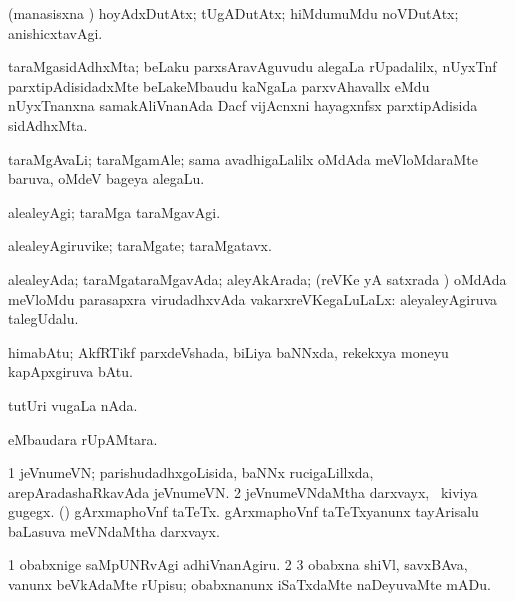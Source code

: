 {\bentry
{} 
\gl{\kirxvi}
\expl{}
\bmng
(manasisxna \vi) hoyAdxDutAtx; tUgADutAtx; hiMdumuMdu noVDutAtx; anishicxtavAgi. 
\emng
\eentry

\bentry
{} 
\gl{\nA}
\expl{}
\bmng
taraMgasidAdhxMta; beLaku parxsAravAguvudu alegaLa rUpadalilx, nUyxTnf parxtipAdisidadxMte beLakeMbaudu kaNgaLa parxvAhavallx eMdu nUyxTnanxna samakAliVnanAda Dacf vijAcnxni hayagxnfsx parxtipAdisida sidAdhxMta. 
\emng
\eentry

\bentry
{} 
\gl{\nA}
\expl{}
\bmng
taraMgAvaLi; taraMgamAle; sama avadhigaLalilx oMdAda meVloMdaraMte baruva, oMdeV bageya alegaLu. 
\emng
\eentry

\bentry
{} 
\gl{\kirxvi}
\expl{}
\bmng
alealeyAgi; taraMga taraMgavAgi. 
\emng
\eentry

\bentry
{} 
\gl{\nA}
\expl{}
\bmng
alealeyAgiruvike; taraMgate; taraMgatavx. 
\emng
\eentry

\bentry
{} 
\gl{\gu}
\bmng
alealeyAda; taraMgataraMgavAda; aleyAkArada; (reVKe yA satxrada \vi) oMdAda meVloMdu parasapxra virudadhxvAda vakarxreVKegaLuLaLx:  aleyaleyAgiruva talegUdalu. 
\emng
\eentry

\bentry
{} 
\gl{\nA}
\expl{}
\bmng
himabAtu; AkfRTikf parxdeVshada, biLiya baNNxda, rekekxya moneyu kapApxgiruva bAtu. 
\emng
\eentry

\bentry
{} 
\gl{\nA}
\expl{}
\bmng
tutUri \mo vugaLa nAda. 
\emng
\eentry

\bentry
{} 
\gl{\akirx}
\expl{}
\bmng
{} eMbaudara rUpAMtara. 
\emng
\eentry

\bentry
{}
\gl{\nA}
\bmng
\bnum
\num{1} jeVnumeVN; parishudadhxgoLisida, baNNx rucigaLillxda, arepAradashaRkavAda jeVnumeVN. 
\num{2} jeVnumeVNdaMtha darxvayx, \udA\ kiviya gugegx. 
 (\AmA) 
\banum
{} gArxmaphoVnf taTeTx. 
 gArxmaphoVnf taTeTxyanunx tayArisalu baLasuva meVNdaMtha darxvayx. 
\eanum
\numie
\enum
\emng

\noindent 
\gl{\pagu}
\expl{}
\bmng
\bnum
\num{1}  obabxnige saMpUNRvAgi adhiVnanAgiru. 
\num{2}  
\num{3}  obabxna shiVl, savxBAva, \mo vanunx beVkAdaMte rUpisu; obabxnanunx iSaTxdaMte naDeyuvaMte mADu. 
\enum
\emng
\eentry

}
